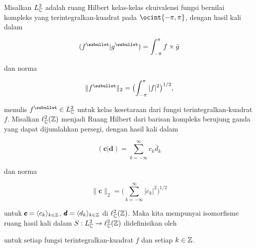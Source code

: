  Misalkan $L_{\Bbb C}^2$ adalah ruang Hilbert kelas-kelas
ekuivalensi fungsi bernilai kompleks yang terintegralkan-kuadrat pada
$\ocint{-\pi,\pi}$, dengan hasil kali dalam

$$(f^{\ssbullet}|g^{\ssbullet})
=\int_{-\pi}^{\pi}f\times\bar g$$

\noindent dan norma

$$\|f^{\ssbullet}\|_2
=\bigl(\int_{-\pi}^{\pi}|f|^2\bigr)^{1/2},$$

\noindent menulis $f^{\ssbullet}\in L_{\Bbb C}^2$ untuk kelas kesetaraan
dari fungsi terintegralkan-kuadrat
 $f$.   Misalkan $\ell_{\Bbb C}^2(\Bbb Z)$ menjadi
Ruang Hilbert dari barisan kompleks berujung ganda
yang dapat dijumlahkan persegi, dengan hasil kali dalam

$$(\pmb{c}|\pmb{d})=\sum_{k=-\infty}^{\infty}c_k\bar d_k$$

\noindent dan norma

$$\|\pmb{c}\|_2
=\bigl(\sum_{k=-\infty}^{\infty}|c_k|^2\bigr)^{1/2}$$

\noindent untuk $\pmb{c}=\langle c_k\rangle_{k\in\Bbb Z}$,
$\pmb{d}=\langle d_k\rangle_{k\in\Bbb Z}$ di $\ell_{\Bbb C}^2(\Bbb Z)$.
Maka kita mempunyai isomorfisme ruang hasil kali dalam
$S:L_{\Bbb C}^2\to\ell_{\Bbb C}^2(\Bbb Z)$
didefinisikan oleh


\noindent untuk setiap fungsi terintegralkan-kuadrat $f$ dan setiap
$k\in\Bbb Z$.

